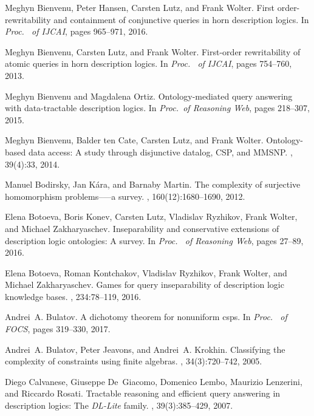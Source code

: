 \documentclass{lmcs}
\theoremstyle{definition}
\begin{document}
\begin{thebibliography}{10}
Meghyn Bienvenu, Peter Hansen, Carsten Lutz, and Frank Wolter.
\newblock First order-rewritability and containment of conjunctive queries in
  horn description logics.
\newblock In {\em Proc. \ of {IJCAI}}, pages 965--971, 2016.

Meghyn Bienvenu, Carsten Lutz, and Frank Wolter.
\newblock First-order rewritability of atomic queries in horn description
  logics.
\newblock In {\em Proc. \ of {IJCAI}}, pages 754--760, 2013.

Meghyn Bienvenu and Magdalena Ortiz.
\newblock Ontology-mediated query answering with data-tractable description
  logics.
\newblock In {\em Proc.\ of Reasoning Web}, pages 218--307, 2015.

Meghyn Bienvenu, Balder ten Cate, Carsten Lutz, and Frank Wolter.
\newblock Ontology-based data access: {A} study through disjunctive datalog,
  {CSP}, and {MMSNP}.
, 39(4):33, 2014.

Manuel Bodirsky, Jan K{\'a}ra, and Barnaby Martin.
\newblock The complexity of surjective homomorphism problems--—a survey.
, 160(12):1680--1690, 2012.

Elena Botoeva, Boris Konev, Carsten Lutz, Vladislav Ryzhikov, Frank Wolter, and
  Michael Zakharyaschev.
\newblock Inseparability and conservative extensions of description logic
  ontologies: {A} survey.
\newblock In {\em Proc. \ of Reasoning Web}, pages 27--89, 2016.

Elena Botoeva, Roman Kontchakov, Vladislav Ryzhikov, Frank Wolter, and Michael
  Zakharyaschev.
\newblock Games for query inseparability of description logic knowledge bases.
, 234:78--119, 2016.

Andrei~A. Bulatov.
\newblock A dichotomy theorem for nonuniform csps.
\newblock In {\em Proc. \ of {FOCS}}, pages 319--330, 2017.

Andrei~A. Bulatov, Peter Jeavons, and Andrei~A. Krokhin.
\newblock Classifying the complexity of constraints using finite algebras.
, 34(3):720--742, 2005.

Diego Calvanese, Giuseppe De~Giacomo, Domenico Lembo, Maurizio Lenzerini, and
  Riccardo Rosati.
\newblock Tractable reasoning and efficient query answering in description
  logics: The {{\textit{DL-Lite}}} family.
, 39(3):385--429, 2007.


\end{thebibliography}
\end{document}

